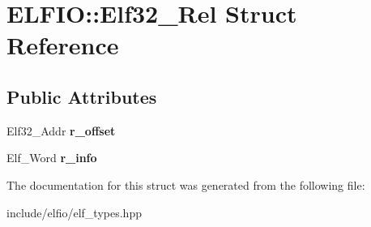 \hypertarget{struct_e_l_f_i_o_1_1_elf32___rel}{}\section{E\+L\+F\+IO\+:\+:Elf32\+\_\+\+Rel Struct Reference}
\label{struct_e_l_f_i_o_1_1_elf32___rel}
\subsection*{Public Attributes}
\begin{DoxyCompactItemize}
\item 
Elf32\+\_\+\+Addr {\bfseries r\+\_\+offset}\hypertarget{struct_e_l_f_i_o_1_1_elf32___rel_a19707fa689f585fd74b0b3a58948e52b}{}\label{struct_e_l_f_i_o_1_1_elf32___rel_a19707fa689f585fd74b0b3a58948e52b}

\item 
Elf\+\_\+\+Word {\bfseries r\+\_\+info}\hypertarget{struct_e_l_f_i_o_1_1_elf32___rel_ae5710e35b439d9dbf3f7dd302a2bcfc1}{}\label{struct_e_l_f_i_o_1_1_elf32___rel_ae5710e35b439d9dbf3f7dd302a2bcfc1}

\end{DoxyCompactItemize}


The documentation for this struct was generated from the following file\+:\begin{DoxyCompactItemize}
\item 
include/elfio/elf\+\_\+types.\+hpp\end{DoxyCompactItemize}
